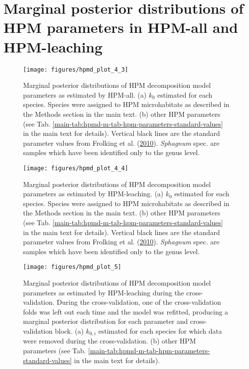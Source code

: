 \documentclass[
  12pt,
]{article}
\begin{document}
\hypertarget{sup-5}{%
\section{Marginal posterior distributions of HPM parameters in HPM-all and HPM-leaching}\label{sup-5}}



\begin{figure}[H]

{\centering \texttt{[image: figures/hpmd\_plot\_4\_3]} 

}

\caption{Marginal posterior distributions of HPM decomposition model parameters as estimated by HPM-all. (a) \(k_0\) estimated for each species. Species were assigned to HPM microhabitats as described in the Methods section in the main text. (b) other HPM parameters (see Tab. \ref{main-tab:hpmd-m-tab-hpm-parameters-standard-values} in the main text for details). Vertical black lines are the standard parameter values from Frolking et al. (\protect\hyperlink{ref-Frolking.2010}{2010}). \emph{Sphagnum} spec. are samples which have been identified only to the genus level.}\label{fig:sup-hpmd-plot-4-3}
\end{figure}



\begin{figure}[H]

{\centering \texttt{[image: figures/hpmd\_plot\_4\_4]} 

}

\caption{Marginal posterior distributions of HPM decomposition model parameters as estimated by HPM-leaching. (a) \(k_0\) estimated for each species. Species were assigned to HPM microhabitats as described in the Methods section in the main text. (b) other HPM parameters (see Tab. \ref{main-tab:hpmd-m-tab-hpm-parameters-standard-values} in the main text for details). Vertical black lines are the standard parameter values from Frolking et al. (\protect\hyperlink{ref-Frolking.2010}{2010}). \emph{Sphagnum} spec. are samples which have been identified only to the genus level.}\label{fig:sup-hpmd-plot-4-4}
\end{figure}



\begin{figure}[H]

{\centering \texttt{[image: figures/hpmd\_plot\_5]} 

}

\caption{Marginal posterior distributions of HPM decomposition model parameters as estimated by HPM-leaching during the cross-validation. During the cross-validation, one of the cross-validation folds was left out each time and the model was refitted, producing a marginal posterior distribution for each parameter and cross-validation block. (a) \(k_{0,i}\) estimated for each species for which data were removed during the cross-validation. (b) other HPM parameters (see Tab. \ref{main-tab:hpmd-m-tab-hpm-parameters-standard-values} in the main text for details).}\label{fig:sup-hpmd-plot-5}
\end{figure}
\end{document}
